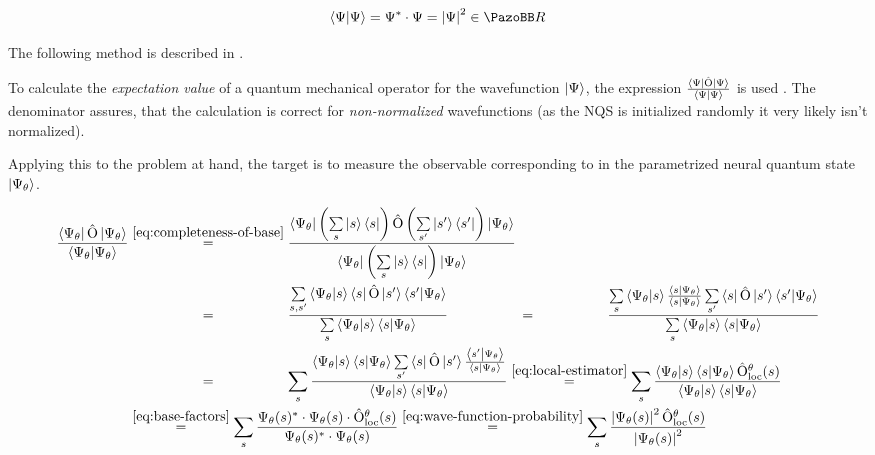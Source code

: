 \begin{equation}
    \label{eq:wave-function-probability}
    \bra{\Psi}\ket{\Psi} = \Psi^\ast\cdot \Psi = \left|\Psi\right|^2 \in \mathbb{R}
\end{equation}

The following method is described in \cite{jVMCPaper}.

To calculate the \emph{expectation value} of a quantum mechanical operator \operator for the wavefunction $\ket{\Psi}$, the expression 
$\frac{\bra{\Psi}\hat{\mathrm{O}}\ket{\Psi}}{\bra{\Psi}\ket{\Psi}}$ is used \cite{schwablQM}. The denominator assures, that the calculation is correct for \emph{non-normalized} wavefunctions (as the NQS is initialized randomly it very likely isn't normalized). 

Applying this to the problem at hand, the target is to measure the observable corresponding to \operator in the parametrized neural quantum state $\ket{\Psi_\theta}$.

\begin{equation}
    \label{eq:derivation-local-estimator}
    \begin{split}
        \frac{\bra{\Psi_\theta}\operator\ket{\Psi_\theta}}{\bra{\Psi_\theta}\ket{\Psi_\theta}} &\stackrel{\ref{eq:completeness-of-base}}{=}
        \frac{\bra{\Psi_\theta} \left(\sum\limits_{s} \ket{s}\bra{s}\right)
        \operator \left(\sum\limits_{s'} \ket{s'}\bra{s'}\right) \ket{\Psi_\theta}}{\bra{\Psi_\theta}\left(\sum\limits_{s} \ket{s}\bra{s}\right)\ket{\Psi_\theta}}\\
        &\stackrel{\phantom{\ref{eq:completeness-of-base}}}{=}
        \frac{\sum\limits_{s, s'} \bra{\Psi_\theta} \ket{s}\bra{s}
        \operator \ket{s'}\bra{s'} \ket{\Psi_\theta}}{\sum\limits_{s}\bra{\Psi_\theta}\ket{s}\bra{s}\ket{\Psi_\theta}}
        \stackrel{\phantom{\ref{eq:completeness-of-base}}}{=}
        \frac{\sum\limits_{s} \bra{\Psi_\theta} \ket{s} \frac{\bra{s} \ket{\Psi_\theta}}{\bra{s} \ket{\Psi_\theta}} \sum\limits_{s'} \bra{s}
        \operator \ket{s'}\bra{s'} \ket{\Psi_\theta}}{\sum\limits_{s}\bra{\Psi_\theta}\ket{s}\bra{s}\ket{\Psi_\theta}}\\
        &\stackrel{\phantom{\ref{eq:completeness-of-base}}}{=}
        \sum\limits_{s} \frac{ \bra{\Psi_\theta} \ket{s}\bra{s} \ket{\Psi_\theta} \sum\limits_{s'} \bra{s}
        \operator \ket{s'} \frac{\bra{s'} \ket{\Psi_\theta}}{\bra{s} \ket{\Psi_\theta}}}{\bra{\Psi_\theta}\ket{s}\bra{s}\ket{\Psi_\theta}}
        \stackrel{\ref{eq:local-estimator}}{=}
        \sum\limits_{s} \frac{ \bra{\Psi_\theta} \ket{s}\bra{s} \ket{\Psi_\theta} \operator_\mathrm{loc}^\theta(s)}{\bra{\Psi_\theta}\ket{s}\bra{s}\ket{\Psi_\theta}}\\
        &\stackrel{\ref{eq:base-factors}}{=}
        \sum\limits_{s} \frac{ \Psi_\theta(s)^\ast \cdot \Psi_\theta(s) \cdot \operator_\mathrm{loc}^\theta(s)}{\Psi_\theta(s)^\ast \cdot \Psi_\theta(s)}
        \stackrel{\ref{eq:wave-function-probability}}{=}
        \sum\limits_{s} \frac{ \left|\Psi_\theta(s)\right|^2  \operator_\mathrm{loc}^\theta(s)}{\left|\Psi_\theta(s)\right|^2}
    \end{split}
\end{equation}

